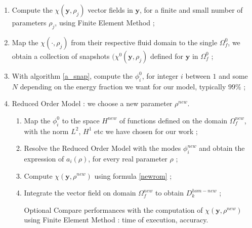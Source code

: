 \begin{algo}\label{a_rom}
\begin{enumerate}[label=\textbf{(S \hspace{-7pt} \Roman*)}]
\item Compute the $\chi\left(\mathbf{y},\rho_j\right)$ vector fields in $\mathbf{y}$, for a finite and small number of parameters $\rho_j$, %
using Finite Element Method ;
\item Map the $\chi (\cdot,\rho_j)$ from their respective fluid domain to the single $\Omega_f^0$, we obtain a collection of snapshots $(\chi^0(\mathbf{y},\rho_j)$ %
defined for $\mathbf{y}$ in $\Omega_f^0$ ;
\item With algorithm \ref{a_snap}, compute the $\phi^0_i$, for integer $i$ between $1$ and some $N$ depending on the energy fraction we want for our model, typically $99\%$ ;
\item Reduced Order Model : we choose a new parameter $\rho^{new}$.
\begin{enumerate}[label=(\textbf{se}\ \roman*)]
\item Map the $\phi_i^0$ to the space $H^{new}$ of functions defined on the domain $\Omega_f^{new}$, with the norm $L^2$, $H^1$ etc we have chosen for our work ;
\item Resolve the Reduced Order Model with the modes $\phi_i^{new}$ and obtain the expression of $a_i(\rho)$, for every real parameter $\rho$ ;
\item Compute $\chi(\mathbf{y},\rho^{new})$ using formula \ref{newrom} ;
\item Integrate the vector field on domain $\Omega_f^{new}$ to obtain $D_k^{hom-new}$ ;
\item[Optional] Compare performances with the computation of $\chi(\mathbf{y},\rho^{new})$ using Finite Element Method : %
time of execution, accuracy.
\end{enumerate}
\end{enumerate}
\end{algo}